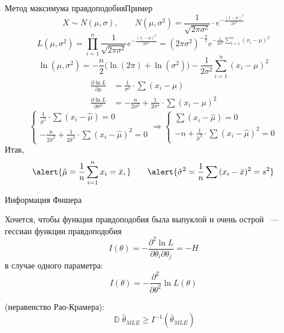 \documentclass[11pt,pdf,utf8,hyperref={unicode},aspectratio=169]{beamer}
\DeclareMathOperator{\DD}{\mathbb{D}}
\begin{document}
\begin{frame}[allowframebreaks]{Метод максимума правдоподобия}{Пример}
    $$
        X \sim N(\mu,\sigma), \qquad
        N(\mu, \sigma^2) = \frac{1}{\sqrt{2 \pi \sigma^2}} \cdot e^{-\frac{(x - \mu)^2}{2\sigma^2}}
    $$
    $$
        L(\mu, \sigma^2)
        = \prod_{i=1}^n\frac{1}{\sqrt{2\pi \sigma^2}} e^{-\frac{(x_i - \mu)^2}{2\sigma^2}}
        = (2\pi \sigma^2)^{-\frac{n}{2}} e^{-\frac{1}{2\sigma^2} \sum\limits_{i=1}^n(x_i - \mu)^2}
    $$
    $$
        \ln(\mu, \sigma^2) = -\frac{n}{2}\big(\ln(2\pi)+\ln(\sigma^2)\big) - \frac{1}{2\sigma^2}\sum\limits_{i=1}^n(x_i - \mu)^2
    $$
    $$
    \begin{aligned}
        \frac{\partial \ln{L}}{\partial \mu} &= \frac{1}{\sigma^2} \cdot \sum{(x_i - \mu)}\\
        \frac{\partial \ln{L}}{\partial \sigma^2} &= -\frac{n}{2\sigma^2} + \frac{1}{2\sigma^4} \cdot \sum{(x_i - \mu)^2}
    \end{aligned}
    $$
    $$
    \left\lbrace\begin{aligned}
        \frac{1}{\hat\sigma^2} \cdot \sum{(x_i - \hat\mu)} = 0 \\
        -\frac{n}{2\hat\sigma^2} + \frac{1}{2\hat\sigma^4} \cdot \sum{(x_i - \hat\mu)^2} = 0
    \end{aligned}\right.
    \Rightarrow
    \left\lbrace\begin{aligned}
        \sum{(x_i - \hat\mu)} = 0 \\
        -n + \frac{1}{\hat\sigma^2} \cdot \sum{(x_i - \hat\mu)^2} = 0
    \end{aligned}\right.
    $$
    Итак,
    $$
        \alert{\hat\mu = \frac{1}{n}\sum_{i=1}^n{x_i} = \bar{x},}\qquad
        \alert{\hat\sigma^2 = \frac{1}{n} \sum{(x_i - \bar{x})^2=s^2}}
    $$
\end{frame}
\begin{frame}{Информация Фишера}

    Хочется, чтобы функция правдоподобия была выпуклой и очень острой
	~--- гессиан функции правдоподобия
    $$
        I(\theta) = - \frac{\partial^2\ln{L}}{\partial\theta_i\partial\theta_j}= -H
    $$
    в случае одного параметра:
	$$
        I\left(\theta\right) =  - \frac{\partial^2}{\partial\theta^2}\ln L\left(\theta\right)
    $$

    \bigskip
	 (неравенство Рао-Крамера):
	$$\DD\hat{\theta}_{MLE} \geqslant I^{-1}\left(\hat{\theta}_{MLE}\right)$$
\end{frame}
\end{document}
